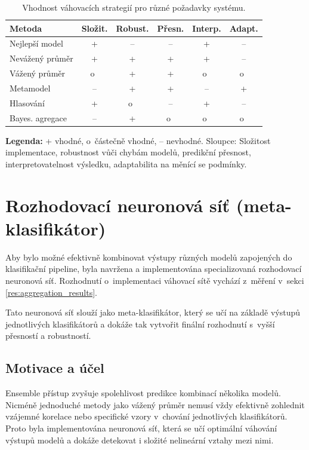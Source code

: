 \begin{table}[H]
\centering
\renewcommand{\arraystretch}{1.1}
\begin{tabular}{|l|c|c|c|c|c|}
\hline
\textbf{Metoda} & \textbf{Složit.} & \textbf{Robust.} & \textbf{Přesn.} & \textbf{Interp.} & \textbf{Adapt.} \\
\hline
Nejlepší model         & + & – & – & + & – \\
Nevážený průměr        & + & + & + & + & – \\
Vážený průměr          & o~& + & + & o~& o~\\
Metamodel              & – & + & + & – & + \\
Hlasování              & + & o~& – & + & – \\
Bayes. agregace        & – & + & o~& o~& o~\\
\hline
\end{tabular}
\caption{Vhodnost váhovacích strategií pro různé požadavky systému.}
\label{tab:agg_strategies_compact}
\end{table}

\vspace{1mm}
\noindent\textbf{Legenda:} + vhodné, o~částečně vhodné, – nevhodné. Sloupce: Složitost implementace, robustnost vůči chybám modelů, predikční přesnost, interpretovatelnost výsledku, adaptabilita na měnící se podmínky.





\section{Rozhodovací neuronová síť (meta-klasifikátor)}

Aby bylo možné efektivně kombinovat výstupy různých modelů zapojených do klasifikační pipeline, byla navržena a implementována specializovaná rozhodovací neuronová síť. Rozhodnutí o~implementaci váhovací sítě vychází z~měření v~sekci \ref{res:aggregation_results}.

Tato neuronová síť slouží jako meta-klasifikátor, který se učí na základě výstupů jednotlivých klasifikátorů a dokáže tak vytvořit finální rozhodnutí s~vyšší přesností a robustností.

\subsection{Motivace a účel}
Ensemble přístup zvyšuje spolehlivost predikce kombinací několika modelů. Nicméně jednoduché metody jako vážený průměr nemusí vždy efektivně zohlednit vzájemné korelace nebo specifické vzory v~chování jednotlivých klasifikátorů. Proto byla implementována neuronová síť, která se učí optimální váhování výstupů modelů a dokáže detekovat i složité nelineární vztahy mezi nimi.

